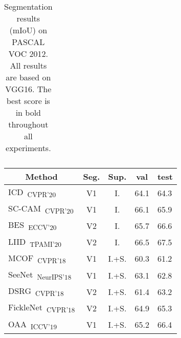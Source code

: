 \documentclass[final]{cvpr}
\begin{document}
\begin{table}[]
{\begin{tabular}{@{}lccll@{}}
\end{tabular}
}
\vspace{2mm}
\caption{Segmentation results (mIoU) on PASCAL VOC 2012. All results are based on VGG16. The best score is in bold throughout all experiments.}\vspace{-3mm}
\label{tab:seg_quan_voc_vgg16}
\end{table} \begin{table}[]
\normalsize
\centering
{\small
\begin{tabular}{@{}lccll@{}}
\toprule
\multicolumn{1}{c}{Method}                                                              & Seg.      & Sup.  & \multicolumn{1}{c}{val} & \multicolumn{1}{c}{test} \\ \midrule
\multicolumn{1}{l}{ICD~\cite{fan2020learning}\textsubscript{CVPR'20}}                   & V1        & I.    & 64.1                    & 64.3                     \\ 
\multicolumn{1}{l}{SC-CAM~\cite{chang2020weakly}\textsubscript{CVPR'20}}                & V1        & I.    & 66.1                    & 65.9                     \\
\multicolumn{1}{l}{BES~\cite{chen2020boundary}\textsubscript{ECCV'20}}                  & V2        & I.    & 65.7                    & 66.6                     \\
\multicolumn{1}{l}{LIID~\cite{liu2020leveraging}\textsubscript{TPAMI'20}}                  & V2        & I.    & 66.5                    & 67.5                     \\
\multicolumn{1}{l}{MCOF~\cite{wang2018weakly}\textsubscript{CVPR'18}}                   & V1        & I.+S. & 60.3                    & 61.2                     \\
\multicolumn{1}{l}{SeeNet~\cite{hou2018self}\textsubscript{NeurIPS'18}}                 & V1        & I.+S. & 63.1                    & 62.8                     \\
\multicolumn{1}{l}{DSRG~\cite{huang2018weakly}\textsubscript{CVPR'18}}                  & V2        & I.+S. & 61.4                    & 63.2                     \\
\multicolumn{1}{l}{FickleNet~\cite{lee2019ficklenet}\textsubscript{CVPR'18}}            & V2        & I.+S. & 64.9                    & 65.3                     \\
\multicolumn{1}{l}{OAA~\cite{jiang2019integral}\textsubscript{ICCV'19}}                 & V1        & I.+S. & 65.2                    & 66.4                     \\

\end{tabular}}
\end{table}
\end{document}
